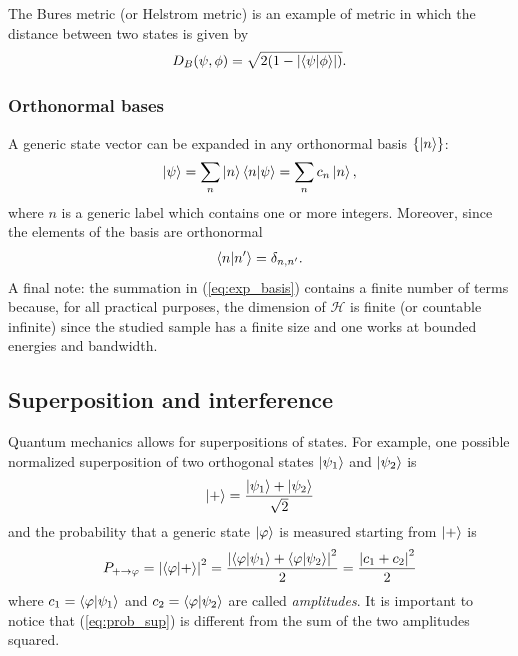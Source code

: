 \begin{tcolorbox}
The Bures metric (or Helstrom metric) is an example of metric in which the distance between two states is given by
\begin{align*}
    D_B(\psi, \phi) = \sqrt{2 (1 - \abs{\braket{\psi}{\phi}})}.
\end{align*}
\end{tcolorbox}

\subsubsection{Orthonormal bases}
A generic state vector can be expanded in any orthonormal basis $\{ \ket{n}\}$:
\begin{align}
\label{eq:exp_basis}
    \ket{\psi} = \sum_n \ket{n} \braket{n}{\psi} = \sum_n c_n \ket{n},
\end{align}
where $n$ is a generic label which contains one or more integers. Moreover, since the elements of the basis are orthonormal
\begin{align*}
    \braket{n}{n'} = \delta_{n,n'}. 
\end{align*}
A final note: the summation in (\ref{eq:exp_basis}) contains a finite number of terms because, for all practical purposes, the dimension of $\mathcal{H}$ is finite (or countable infinite) since the studied sample has a finite size and one works at bounded energies and bandwidth. 

\subsection{Superposition and interference}

Quantum mechanics allows for superpositions of states. For example, one possible normalized superposition of two orthogonal states $\ket{\psi_1}$ and $\ket{\psi_2}$ is 
\begin{align*}
    \ket{+} = \frac{\ket{\psi_1} + \ket{\psi_2}}{\sqrt{2}} 
\end{align*}
and the probability that a generic state $\ket{\varphi}$ is measured starting from $\ket{+}$ is 
\begin{align}
\label{eq:prob_sup}
    P_{ + \to \varphi } = \abs{\braket{\varphi}{+}}^2 = \frac{\abs{\braket{\varphi}{\psi_1} + \braket{\varphi}{\psi_2}}^2}{2} = \frac{\abs{c_1 + c_2}^2}{2} 
\end{align}
where $c_1 = \braket{\varphi}{\psi_1}$ and $c_2 = \braket{\varphi}{\psi_2}$ are called \textit{amplitudes}. It is important to notice that (\ref{eq:prob_sup}) is different from the sum of the two amplitudes squared. 

